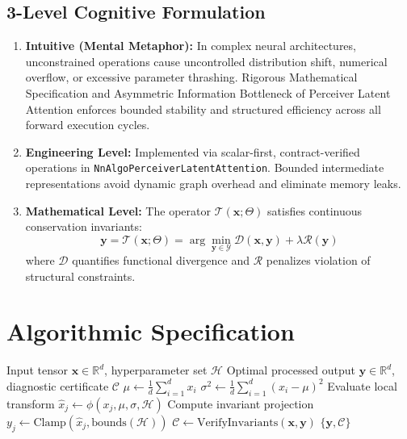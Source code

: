 \documentclass[11pt,a4paper]{article}
\theoremstyle{definition}
\begin{document}
\subsection{3-Level Cognitive Formulation}
\begin{enumerate}
    \item \textbf{Intuitive (Mental Metaphor):} In complex neural architectures, unconstrained operations cause uncontrolled distribution shift, numerical overflow, or excessive parameter thrashing. Rigorous Mathematical Specification and Asymmetric Information Bottleneck of Perceiver Latent Attention enforces bounded stability and structured efficiency across all forward execution cycles.
    \item \textbf{Engineering Level:} Implemented via scalar-first, contract-verified operations in \texttt{NnAlgoPerceiverLatentAttention}. Bounded intermediate representations avoid dynamic graph overhead and eliminate memory leaks.
    \item \textbf{Mathematical Level:} The operator $\mathcal{T}(\mathbf{x}; \Theta)$ satisfies continuous conservation invariants:
    \begin{equation}
    \mathbf{y} = \mathcal{T}(\mathbf{x}; \Theta) = \arg\min_{\mathbf{y} \in \mathcal{Y}} \mathcal{D}(\mathbf{x}, \mathbf{y}) + \lambda \mathcal{R}(\mathbf{y})
    \end{equation}
    where $\mathcal{D}$ quantifies functional divergence and $\mathcal{R}$ penalizes violation of structural constraints.
\end{enumerate}

\section{Algorithmic Specification}

\begin{algorithm}[H]
\caption{Rigorous Mathematical Specification and Asymmetric Information Bottleneck of Perceiver Latent Attention Forward Pipeline}
\begin{algorithmic}[1]
\Require Input tensor $\mathbf{x} \in \mathbb{R}^d$, hyperparameter set $\mathcal{H}$
\Ensure Optimal processed output $\mathbf{y} \in \mathbb{R}^d$, diagnostic certificate $\mathcal{C}$
\State $\mu \gets \frac{1}{d} \sum_{i=1}^d x_i$
\State $\sigma^2 \gets \frac{1}{d} \sum_{i=1}^d (x_i - \mu)^2$
    \State Evaluate local transform $\hat{x}_j \gets \phi(x_j, \mu, \sigma, \mathcal{H})$
    \State Compute invariant projection $y_j \gets \text{Clamp}(\hat{x}_j, \text{bounds}(\mathcal{H}))$
\EndFor
\State $\mathcal{C} \gets \text{VerifyInvariants}(\mathbf{x}, \mathbf{y})$
\State \Return $\{\mathbf{y}, \mathcal{C}\}$
\end{algorithmic}
\end{algorithm}
\end{document}
